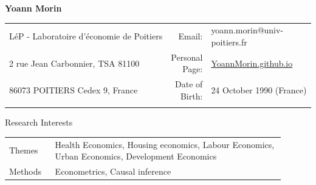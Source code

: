 \documentclass{resume} %
\date{}
\begin{document}
\begin{center}
{\LARGE \textbf{Yoann Morin}}
\end{center}
\vspace*{5mm}
\begin{table}[h]
{\def\arraystretch{1.2}\tabcolsep=0pt
\begin{tabular}{p{0.60\linewidth}p{0.05\linewidth}p{0.35\linewidth}}
  
  LéP - Laboratoire d'économie de Poitiers & \multicolumn{1}{r}{Email:\;\;} & \multicolumn{1}{l}{yoann.morin@univ-poitiers.fr} \\
  
  2 rue Jean Carbonnier, TSA 81100 & \multicolumn{1}{r}{Personal Page:\;\;} &\multicolumn{1}{l}{\href{http://YoannMorin.github.io}{YoannMorin.github.io}} \\
  
  86073 POITIERS Cedex 9, France & \multicolumn{1}{r}{Date of Birth:\;\;} & \multicolumn{1}{l}{{24 October 1990 (France)}} \\
  
  & \multicolumn{1}{r}{ } & \multicolumn{1}{l}{ } \\

\end{tabular}%
}
\end{table}
\begin{rSection}{Research Interests}
\begin{table}[H]
{\def\arraystretch{1.5}\tabcolsep=0pt
\begin{tabular}{p{0.15\linewidth}p{0.75\linewidth}}
Themes &  Health Economics, Housing economics, Labour Economics, Urban Economics, Development Economics \\
Methods &  Econometrics, Causal inference \\
\end{tabular}%
}
\end{table}
\end{rSection}
\end{document}
